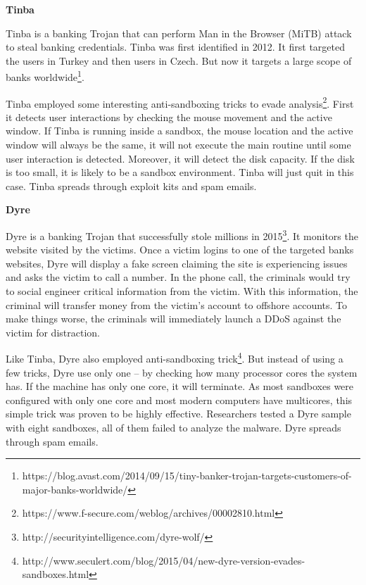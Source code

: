 \documentclass[12pt]{article}
\begin{document}
\textbf{Tinba} 

Tinba is a banking Trojan that can perform Man in the Browser (MiTB) attack to steal banking 
credentials. Tinba was first identified in 2012. It first targeted the users in Turkey and then 
users in Czech. But now it targets a large scope of banks worldwide\footnote{https://blog.avast.com/2014/09/15/tiny-banker-trojan-targets-customers-of-major-banks-worldwide/}. 

Tinba employed  some  interesting anti-sandboxing  tricks  to evade analysis\footnote{https://www.f-secure.com/weblog/archives/00002810.html}.  First  it detects 
user interactions by checking the mouse movement and the active window. If Tinba is running 
inside a sandbox, the mouse location and the active window will always be the same, it will 
not execute the main routine until some user interaction is detected. Moreover, it will detect 
the disk capacity. If the disk is too small, it is likely to be a sandbox environment. Tinba will 
just quit in this case. Tinba spreads through exploit kits and spam emails. 

\textbf{Dyre} 

Dyre  is  a  banking  Trojan  that  successfully  stole millions  in  2015\footnote{http://securityintelligence.com/dyre-wolf/ }.  It monitors  the website 
visited by the victims. Once a victim logins to one of the targeted banks websites, Dyre will 
display  a  fake  screen  claiming  the  site  is  experiencing  issues  and  asks  the  victim  to  call  a 
number. In the phone call, the criminals would try to social engineer critical information from 
the victim. With this information, the criminal will transfer money from the victim’s account 
to offshore accounts. To make things worse, the criminals will immediately launch a DDoS 
against the victim for distraction. 

Like Tinba, Dyre also employed anti-sandboxing trick\footnote{http://www.seculert.com/blog/2015/04/new-dyre-version-evades-sandboxes.html }. But instead of using a few tricks, Dyre 
use only one – by checking how many processor cores the system has. If the machine has only 
one core, it will terminate. As most sandboxes were configured with only one core and most 
modern  computers  have  multicores,  this  simple  trick  was  proven  to  be  highly  effective. 
Researchers  tested  a Dyre  sample with  eight  sandboxes,  all  of  them  failed  to  analyze  the 
malware. Dyre spreads through spam emails. 
 
\end{document}
